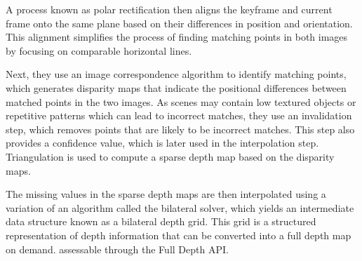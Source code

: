 A process known as polar rectification then aligns the keyframe and current frame onto the same plane based on their differences in position and orientation.
This alignment simplifies the process of finding matching points in both images by focusing on comparable horizontal lines.

Next, they use an image correspondence algorithm to identify matching points,
which generates disparity maps that indicate the positional differences between matched points in the two images.
As scenes may contain low textured objects or repetitive patterns which can lead to incorrect matches,
they use an invalidation step, which removes points that are likely to be incorrect matches.
This step also provides a confidence value, which is later used in the interpolation step.
Triangulation is used to compute a sparse depth map based on the disparity maps.

The missing values in the sparse depth maps are then interpolated using a variation of an algorithm called the bilateral solver,
which yields an intermediate data structure known as a bilateral depth grid.
This grid is a structured representation of depth information that can be converted into a full depth map on demand.
assessable through the Full Depth API\@.

